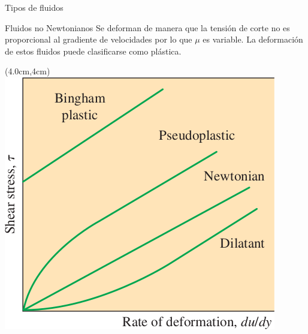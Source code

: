 \documentclass [xcolor=svgnames, t] {beamer}
\begin{document}
\begin{frame}{Tipos de fluidos}
\begin{block}{Fluidos no Newtonianos}
Se deforman de manera que la tensi\'on de corte no es proporcional al gradiente de velocidades por lo que $\mu$ es variable. La deformaci\'on de estos fluidos  puede clasificarse como pl\'astica.
\end{block}
\begin{textblock*}{5cm}(4.0cm,4cm) %
\includegraphics[width=\textwidth]{nonew}
\end{textblock*}
\end{frame}
\end{document}
